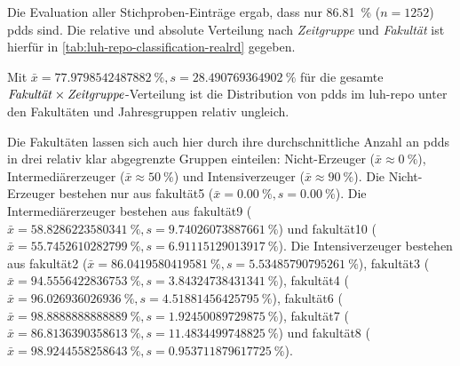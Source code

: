 Die Evaluation aller Stichproben-Einträge ergab, dass nur \SI[round-mode=places,round-precision=2]{86,81}{\percent} ($n=\num{1252}$) \glspl{pdd} sind. Die relative und absolute Verteilung nach \textit{Zeitgruppe} und \textit{Fakultät} ist hierfür in \cref{tab:luh-repo-classification-realrd} gegeben.
\begin{table}[!htbp]
	\caption{Anteil an Dissertationen aus der Stichprobe, die \glspl{pd} produziert haben müssten, relativ zu der respektiven $\text{\textit{Fakultät}}\times\text{\textit{Zeitgruppe}}$-Gesamtanzahl.
    Absolute Werte in Klammern angegeben.}
    
    \label{tab:luh-repo-classification-realrd}
\end{table}
Mit $\bar{x}=\SI[round-mode=places,round-precision=2]{77.9798542487882}{\percent},s=\SI[round-mode=places,round-precision=2]{28.490769364902}{\percent}$ für die gesamte $\text{\textit{Fakultät}}\times\text{\textit{Zeitgruppe}}$-Verteilung ist die Distribution von \glspl{pdd} im \gls{luh-repo} unter den Fakultäten und Jahresgruppen relativ ungleich.

Die Fakultäten lassen sich auch hier durch ihre durchschnittliche Anzahl an \glspl{pdd} in drei relativ klar abgegrenzte Gruppen einteilen: Nicht-Erzeuger ($\bar{x}\approx\SI[round-mode=places,round-precision=2]{0}{\percent}$), Intermediärerzeuger ($\bar{x}\approx\SI[round-mode=places,round-precision=2]{50}{\percent}$) und Intensiverzeuger ($\bar{x}\approx\SI[round-mode=places,round-precision=2]{90}{\percent}$).
Die Nicht-Erzeuger bestehen nur aus \gls{fakultät5} ($\bar{x}=\SI[round-mode=places,round-precision=2]{0.00}{\percent},s=\SI[round-mode=places,round-precision=2]{0.00}{\percent}$).
Die Intermediärerzeuger bestehen aus \gls{fakultät9} ($\bar{x}=\SI[round-mode=places,round-precision=2]{58.8286223580341}{\percent},s=\SI[round-mode=places,round-precision=2]{9.74026073887661}{\percent}$) und \gls{fakultät10} ($\bar{x}=\SI[round-mode=places,round-precision=2]{55.7452610282799}{\percent},s=\SI[round-mode=places,round-precision=2]{6.91115129013917}{\percent}$).
Die Intensiverzeuger bestehen aus \gls{fakultät2} ($\bar{x}=\SI[round-mode=places,round-precision=2]{86.0419580419581}{\percent},s=\SI[round-mode=places,round-precision=2]{5.53485790795261}{\percent}$), \gls{fakultät3} ($\bar{x}=\SI[round-mode=places,round-precision=2]{94.5556422836753}{\percent},s=\SI[round-mode=places,round-precision=2]{3.84324738431341}{\percent}$), \gls{fakultät4} ($\bar{x}=\SI[round-mode=places,round-precision=2]{96.026936026936}{\percent},s=\SI[round-mode=places,round-precision=2]{4.51881456425795}{\percent}$), \gls{fakultät6} ($\bar{x}=\SI[round-mode=places,round-precision=2]{98.8888888888889}{\percent},s=\SI[round-mode=places,round-precision=2]{1.92450089729875}{\percent}$), \gls{fakultät7} ($\bar{x}=\SI[round-mode=places,round-precision=2]{86.8136390358613}{\percent},s=\SI[round-mode=places,round-precision=2]{11.4834499748825}{\percent}$) und \gls{fakultät8} ($\bar{x}=\SI[round-mode=places,round-precision=2]{98.9244558258643}{\percent},s=\SI[round-mode=places,round-precision=2]{0.953711879617725}{\percent}$).

